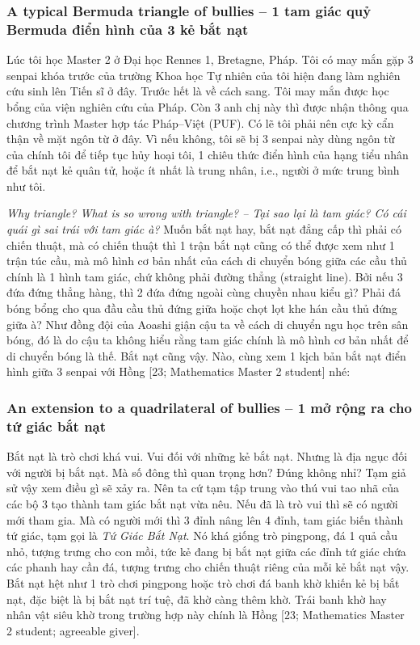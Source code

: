 \documentclass[12pt,oneside]{book}
\begin{document}
\subsubsection{A typical Bermuda triangle of bullies -- 1 tam giác quỷ Bermuda điển hình của 3 kẻ bắt nạt}
Lúc tôi học Master 2 ở Đại học Rennes 1, Bretagne, Pháp. Tôi có may mắn gặp 3 senpai khóa trước của trường Khoa học Tự nhiên của tôi hiện đang làm nghiên cứu sinh lên Tiến sĩ ở đây. Trước hết là về cách sang. Tôi may mắn được học bổng của viện nghiên cứu của Pháp. Còn 3 anh chị này thì được nhận thông qua chương trình Master hợp tác Pháp--Việt (PUF). Có lẽ tôi phải nên cực kỳ cẩn thận về mặt ngôn từ ở đây. Vì nếu không, tôi sẽ bị 3 senpai này dùng ngôn từ của chính tôi để tiếp tục hủy hoại tôi, 1 chiêu thức điển hình của hạng tiểu nhân để bắt nạt kẻ quân tử, hoặc ít nhất là trung nhân, i.e., người ở mức trung bình như tôi.

{\it Why triangle? What is so wrong with triangle? -- Tại sao lại là tam giác? Có cái quái gì sai trái với tam giác à?} Muốn bắt nạt hay, bắt nạt đẳng cấp thì phải có chiến thuật, mà có chiến thuật thì 1 trận bắt nạt cũng có thể được xem như 1 trận túc cầu, mà mô hình cơ bản nhất của cách di chuyển bóng giữa các cầu thủ chính là 1 hình tam giác, chứ không phải đường thẳng (straight line). Bởi nếu 3 đứa đứng thẳng hàng, thì 2 đứa đứng ngoài cùng chuyền nhau kiểu gì? Phải đá bóng bổng cho qua đầu cầu thủ đứng giữa hoặc chọt lọt khe hán cầu thủ đứng giữa à? Như đồng đội của {\sf Aoashi} giận cậu ta về cách di chuyển ngu học trên sân bóng, đó là do cậu ta không hiểu rằng tam giác chính là mô hình cơ bản nhất để di chuyển bóng là thế. Bắt nạt cũng vậy. Nào, cùng xem 1 kịch bản bắt nạt điển hình giữa 3 senpai với {\sf Hồng [23; Mathematics Master 2 student]} nhé:

\subsubsection{An extension to a quadrilateral of bullies -- 1 mở rộng ra cho tứ giác bắt nạt}
Bắt nạt là trò chơi khá vui. Vui đối với những kẻ bắt nạt. Nhưng là địa ngục đối với người bị bắt nạt. Mà số đông thì quan trọng hơn? Đúng không nhỉ? Tạm giả sử vậy xem điều gì sẽ xảy ra. Nên ta cứ tạm tập trung vào thú vui tao nhã của các bộ 3 tạo thành tam giác bắt nạt vừa nêu. Nếu đã là trò vui thì sẽ có người mới tham gia. Mà có người mới thì 3 đỉnh nâng lên 4 đỉnh, tam giác biến thành tứ giác, tạm gọi là {\it Tứ Giác Bắt Nạt}. Nó khá giống trò pingpong, đá 1 quả cầu nhỏ, tượng trưng cho con mồi, tức kẻ đang bị bắt nạt giữa các đỉnh tứ giác chứa các phanh hay cần đá, tượng trưng cho chiến thuật riêng của mỗi kẻ bắt nạt vậy. Bắt nạt hệt như 1 trò chơi pingpong hoặc trò chơi đá banh khờ khiến kẻ bị bắt nạt, đặc biệt là bị bắt nạt trí tuệ, đã khờ càng thêm khờ. Trái banh khờ hay nhân vật siêu khờ trong trường hợp này chính là {\sf Hồng [23; Mathematics Master 2 student; agreeable giver]}.
\end{document}
